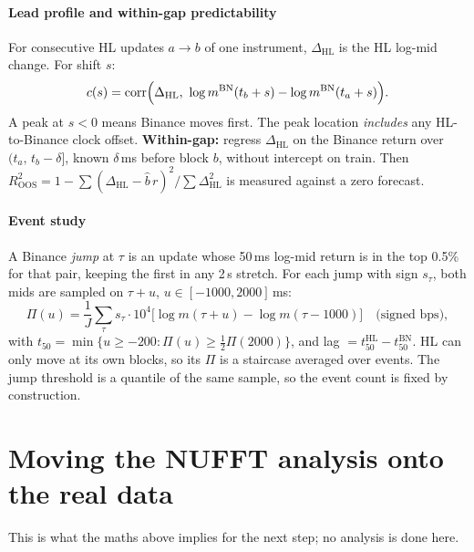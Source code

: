 \documentclass[11pt,a4paper]{article}
\begin{document}
\subsection{Lead profile and within-gap predictability}
For consecutive HL updates $a\to b$ of one instrument, $\Delta_{\text{HL}}$ is the HL log-mid change. For shift $s$:
\begin{equation}
  c(s)=\operatorname{corr}\Bigl(\Delta_{\text{HL}},\ \log m^{\text{BN}}(t_b+s)-\log m^{\text{BN}}(t_a+s)\Bigr).
\end{equation}
A peak at $s<0$ means Binance moves first. The peak location \emph{includes} any HL-to-Binance clock offset.
\textbf{Within-gap:} regress $\Delta_{\text{HL}}$ on the Binance return over $(t_a,\,t_b-\delta]$, known $\delta$\,ms before block $b$, without intercept on train. Then
$R^2_{\text{OOS}}=1-\sum(\Delta_{\text{HL}}-\hat b\,r)^2/\sum\Delta_{\text{HL}}^2$ is measured against a zero forecast.

\subsection{Event study}
A Binance \emph{jump} at $\tau$ is an update whose 50\,ms log-mid return is in the top 0.5\% for that pair, keeping the first in any 2\,s stretch. For each jump with sign
$s_\tau$, both mids are sampled on $\tau+u$, $u\in[-1000,2000]$\,ms:
\begin{equation}
  \Pi(u)=\frac1{J}\sum_\tau s_\tau\cdot10^4\bigl[\log m(\tau+u)-\log m(\tau-1000)\bigr]\quad\text{(signed bps)},
\end{equation}
with $t_{50}=\min\{u\ge-200:\Pi(u)\ge\tfrac12\Pi(2000)\}$, and lag $=t_{50}^{\text{HL}}-t_{50}^{\text{BN}}$. HL can only move at its own blocks, so its $\Pi$ is a staircase
averaged over events. The jump threshold is a quantile of the same sample, so the event count is fixed by construction.

\part{Moving the NUFFT analysis onto the real data}

This is what the maths above implies for the next step; no analysis is done here.
\end{document}
